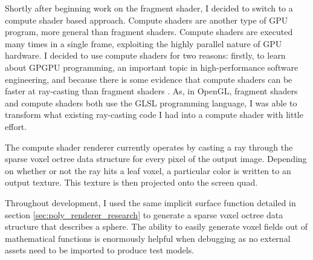 Shortly after beginning work on the fragment shader, I decided to switch to a compute shader based approach. Compute shaders are another type of GPU program, more general than fragment shaders. Compute shaders are executed many times in a single frame, exploiting the highly parallel nature of GPU hardware. I decided to use compute shaders for two reasons: firstly, to learn about GPGPU programming, an important topic in high-performance software engineering, and because there is some evidence that compute shaders can be faster at ray-casting than fragment shaders \autocite{francisco2017comparison}. As, in OpenGL, fragment shaders and compute shaders both use the GLSL programming language, I was able to transform what existing ray-casting code I had into a compute shader with little effort. 

The compute shader renderer currently operates by casting a ray through the sparse voxel octree data structure for every pixel of the output image. Depending on whether or not the ray hits a leaf voxel, a particular color is written to an output texture. This texture is then projected onto the screen quad. 

Throughout development, I used the same implicit surface function detailed in section \ref{sec:poly_renderer_research} to generate a sparse voxel octree data structure that describes a sphere. The ability to easily generate voxel fields out of mathematical functions is enormously helpful when debugging as no external assets need to be imported to produce test models.
